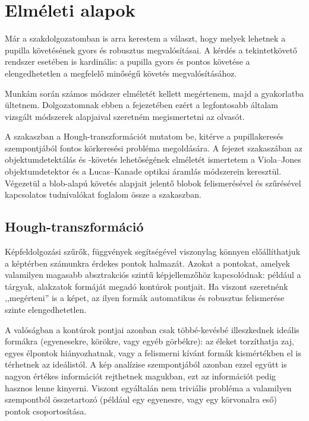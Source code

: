 \chapter{Elméleti alapok}\label{sect:elmeleti_alapok}

Már a szakdolgozatomban \cite{thesis_sajat} is arra kerestem a választ, hogy melyek lehetnek a pupilla követésének gyors és robusztus megvalósításai. A kérdés a tekintetkövető rendszer esetében is kardinális: a pupilla gyors és pontos követése a elengedhetetlen a megfelelő minőségű követés megvalósításához.

Munkám során számos módszer elméletét kellett megértenem, majd a gyakorlatba ültetnem. Dolgozatomnak ebben a fejezetében ezért a legfontosabb általam vizsgált módszerek alapjaival szeretném megismertetni az olvasót.

\bigskip

A  szakaszban a Hough-transzformációt mutatom be, kitérve a pupillakeresés szempontjából fontos körkeresési probléma megoldására. A fejezet  szakaszában az objektumdetektálás és -követés lehetőségének elméletét ismertetem a Viola--Jones objektumdetektor és a Lucas--Kanade optikai áramlás módszerein keresztül. Végezetül a blob-alapú követés alapjait jelentő blobok felismerésével és szűrésével kapcsolatos tudnivalókat foglalom össze a  szakaszban.

\section{Hough-transzformáció}\label{sect:hough}

Képfeldolgozási szűrők, függvények segítségével viszonylag könnyen előállíthatjuk a képtérben számunkra érdekes pontok halmazát. Azokat a pontokat, amelyek valamilyen magasabb absztrakciós szintű képjellemzőhöz kapcsolódnak: például a tárgyak, alakzatok formáját megadó kontúrok pontjait. Ha viszont szeretnénk ,,megérteni'' is a képet, az ilyen formák automatikus és robusztus felismerése szinte elengedhetetlen.

A valóságban a kontúrok pontjai azonban csak többé-kevésbé illeszkednek ideális formákra (egyenesekre, körökre, vagy egyéb görbékre): az éleket torzíthatja zaj, egyes élpontok hiányozhatnak, vagy a felismerni kívánt formák kismértékben el is térhetnek az ideálistól. A kép analízise szempontjából azonban ezzel együtt is nagyon értékes információt rejthetnek magukban, ezt az információt pedig hasznos lenne kinyerni. Viszont egyáltalán nem triviális probléma a valamilyen szempontból összetartozó (például egy egyenesre, vagy egy körvonalra eső) pontok csoportosítása.

